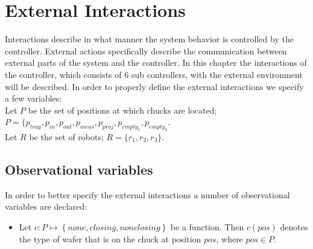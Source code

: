\section{External Interactions}
Interactions describe in what manner the system behavior is controlled by the controller.
External actions specifically describe the communication between external parts of the system and the controller.
In this chapter the interactions of the controller, which consists of $6$ sub controllers, with the external environment will be described.
In order to properly define the external interactions we specify a few variables:
\\Let $P$ be the set of positions at which chucks are located; $P = \{\mathit{p_\mathit{tray}}, p_\mathit{in}, p_\mathit{out}, p_\mathit{meas}, p_\mathit{proj}, p_{\mathit{empty}_1}, p_{\mathit{empty}_2}$.
\\Let $R$ be the set of robots; $R = \{r_1,r_2,r_3\}$.

\subsection{Observational variables}
In order to better specify the external interactions a number of observational variables are declared:
\begin{itemize}
\item Let $c : P \mapsto \left\{\mathit{none}, \mathit{closing}, \mathit{nonclosing}\right\}$ be a function.
Then $c(\mathit{pos})$ denotes the type of wafer that is on the chuck at position $\mathit{pos}$, where $\mathit{pos} \in P$.
\end{itemize}
